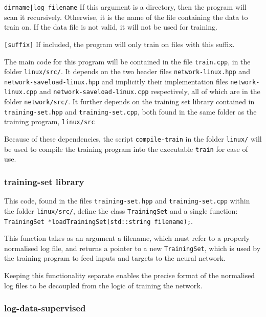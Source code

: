 \documentclass[a4paper]{article}
\begin{document}
\lstinline{dirname|log_filename} If this argument is a directory, then the program will scan it recursively. Otherwise, it is the name of the file containing the data to train on. If the data file is not valid, it will not be used for training.

\lstinline{[suffix]} If included, the program will only train on files with this suffix. 

The main code for this program will be contained in the file \lstinline{train.cpp}, in the folder \lstinline{linux/src/}. It depends on the two header files \lstinline{network-linux.hpp} and \lstinline{network-saveload-linux.hpp} and implicitly their implementation files \lstinline{network-linux.cpp} and \lstinline{network-saveload-linux.cpp} respectively, all of which are in the folder \lstinline{network/src/}. It further depends on the training set library contained in \lstinline{training-set.hpp} and \lstinline{training-set.cpp}, both found in the same folder as the training program, \lstinline{linux/src}

Because of these dependencies, the script \lstinline{compile-train} in the folder \lstinline{linux/} will be used to compile the training program into the executable \lstinline{train} for ease of use.

\subsubsection{training-set library}
\label{subsubsec:dc_csa_trainingset}

This code, found in the files \lstinline{training-set.hpp} and \lstinline{training-set.cpp} within the folder \lstinline{linux/src/}, define the class \lstinline{TrainingSet} and a single function: \lstinline{TrainingSet *loadTrainingSet(std::string filename);}.

This function takes as an argument a filename, which must refer to a properly normalised log file, and returns a pointer to a new \lstinline{TrainingSet}, which is used by the training program to feed inputs and targets to the neural network.

Keeping this functionality separate enables the precise format of the normalised log files to be decoupled from the logic of training the network.

\subsubsection{log-data-supervised}
\label{subsubsec:dc_csa_logsupervised}
\end{document}
